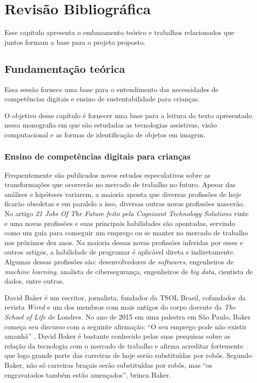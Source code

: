 \chapter{Revisão Bibliográfica} \label{cap:rev}
Esse capitulo apresenta o embasamento teórico e trabalhos relacionados que juntos formam a base para o projeto proposto.

\section{Fundamentação teórica}
Essa sessão fornece uma base para o entendimento das necessidades de competências digitais e ensino de sustentabilidade para crianças.

O objetivo desse capítulo é fornecer uma base para a leitura do texto apresentado nessa monografia em que são estudadas as tecnologias assistivas, visão computacional e as formas de identificação de objetos em imagem.

\subsection{Ensino de competências digitais para crianças}

Frequentemente são publicados novos estudos especulativos sobre as transformações que ocorrerão no mercado de trabalho no futuro. Apesar das análises e hipóteses variarem, a maioria aponta que diversas profissões de hoje ficarão obsoletas e em paralelo a isso, diversas outras novas profissões nascerão. No artigo \textit{21 Jobs Of The Future feito pela Cognizant Technology Solutions} \cite{cognizant_2017} vinte e uma novas profissões e suas principais habilidades são apontadas, servindo como um guia para conseguir um emprego ou se manter no mercado de trabalho nos próximos dez anos. Na maioria dessas novas profissões inferidas por esses e outros artigos, a habilidade de programar é aplicável direta e indiretamente. Algumas dessas profissões são: desenvolvedores de \textit{softwares}, engenheiros de \textit{machine learning}, analista de cibersegurança, engenheiros de \textit{big data}, cientista de dados, entre outras.

David Baker é um escritor, jornalista, fundador da TSOL Brasil, cofundador da revista \textit{Wired} e um dos membros com mais antigos do corpo docente da \textit{The School of Life} de Londres. No ano de 2015 em uma palestra em São Paulo, Baker começa seu discurso com a seguinte afirmação: “O seu emprego pode não existir amanhã” \cite{carvalho_2015}. David Baker é bastante conhecido pelas suas pesquisas sobre as relação da tecnologia com o mercado de trabalho e afirma acreditar fortemente que logo grande parte das carreiras de hoje serão substituídas por robôs. Segundo Baker, não só carreiras braçais serão substituídas por robôs, mas “os engravatados também estão ameaçados”, brinca Baker.

